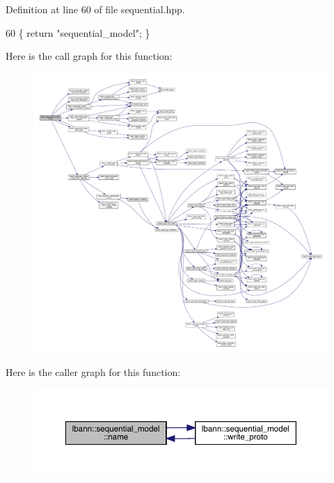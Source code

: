 Definition at line 60 of file sequential.\+hpp.


\begin{DoxyCode}
60 \{ \textcolor{keywordflow}{return} \textcolor{stringliteral}{"sequential\_model"}; \}
\end{DoxyCode}
Here is the call graph for this function\+:\nopagebreak
\begin{figure}[H]
\begin{center}
\leavevmode
\includegraphics[width=350pt]{classlbann_1_1sequential__model_abf2b69dacb5ee3165289377e1d961cd5_cgraph}
\end{center}
\end{figure}
Here is the caller graph for this function\+:\nopagebreak
\begin{figure}[H]
\begin{center}
\leavevmode
\includegraphics[width=350pt]{classlbann_1_1sequential__model_abf2b69dacb5ee3165289377e1d961cd5_icgraph}
\end{center}
\end{figure}
\mbox{\label{classlbann_1_1sequential__model_a9714c99522b90488c486b390c5a7b6f3}} 
